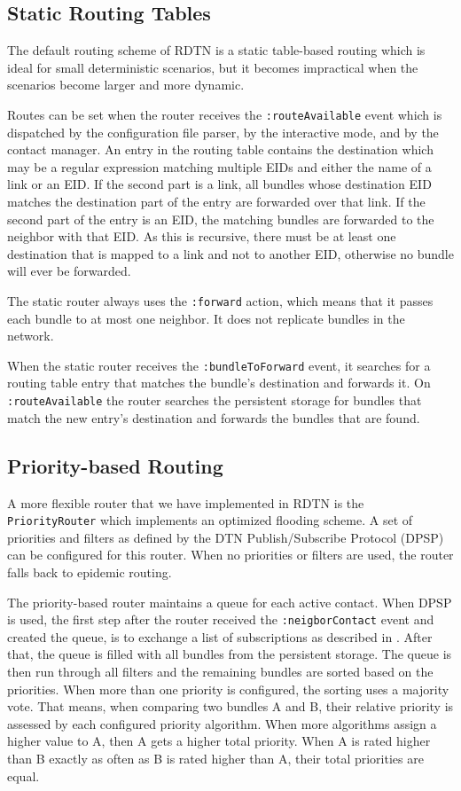 \documentclass{article}
\begin{document}
\subsection{Static Routing Tables}\label{sec.static-routing}

The default routing scheme of RDTN is a static table-based routing which is
ideal for small deterministic scenarios, but it becomes impractical when the
scenarios become larger and more dynamic.

Routes can be set when the router receives the {\tt :routeAvailable} event which
is dispatched by the configuration file parser, by the interactive mode, and by
the contact manager.  An entry in the routing table contains the destination
which may be a regular expression matching multiple EIDs and either the name of
a link or an EID. If the second part is a link, all bundles whose destination
EID matches the destination part of the entry are forwarded over that link. If
the second part of the entry is an EID, the matching bundles are forwarded to
the neighbor with that EID. As this is recursive, there must be at least one
destination that is mapped to a link and not to another EID, otherwise no bundle
will ever be forwarded.

The static router always uses the {\tt :forward} action, which means that it
passes each bundle to at most one neighbor. It does not replicate bundles in the
network.

When the static router receives the {\tt :bundleToForward} event, it searches
for a routing table entry that matches the bundle's destination and forwards it.
On {\tt :routeAvailable} the router searches the persistent storage for bundles
that match the new entry's destination and forwards the bundles that are found.

\subsection{Priority-based Routing}\label{sec.prio-routing}

A more flexible router that we have implemented in RDTN is the {\tt
PriorityRouter} which implements an optimized flooding scheme. A set of
priorities and filters as defined by the DTN Publish/Subscribe Protocol (DPSP)
can be configured for this router. When no priorities or filters are used, the
router falls back to epidemic routing.

The priority-based router maintains a queue for each active contact. When DPSP
is used, the first step after the router received the {\tt :neigborContact}
event and created the queue, is to exchange a list of subscriptions as described
in \cite{dtn-pubsub}. After that, the queue is filled with all bundles from the
persistent storage. The queue is then run through all filters and the remaining
bundles are sorted based on the priorities. When more than one priority is
configured, the sorting uses a majority vote. That means, when comparing two
bundles A and B, their relative priority is assessed by each configured priority
algorithm. When more algorithms assign a higher value to A, then A gets a higher
total priority. When A is rated higher than B exactly as often as B is rated
higher than A, their total priorities are equal.
\end{document}
